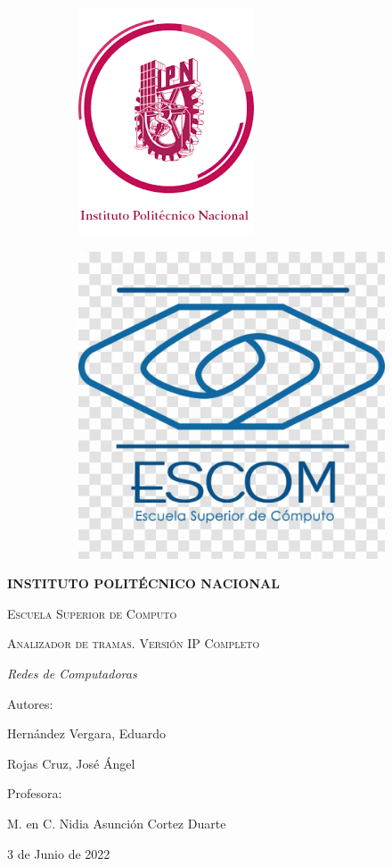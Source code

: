 	\begin{titlepage}
		\begin{figure}[!h]
			\begin{subfigure}{0.5\textwidth}
				\includegraphics[width=0.2\linewidth, inner]{logoIPN}
			\end{subfigure}
			\begin{subfigure}{0.5\textwidth}
				\includegraphics[width=0.2\linewidth, right]{logoESCOM}
			\end{subfigure}	
				
		\end{figure}		
		\centering
		\vspace{1cm}
		{\bfseries\LARGE INSTITUTO POLIT\'ECNICO NACIONAL \par}
		\vspace{1cm}
		{\scshape\Large Escuela Superior de Computo \par}
		\vspace{3cm}
		{\scshape\Huge Analizador de tramas. Versi\'on IP  Completo\par}
		\vspace{3cm}
		{\itshape\Large Redes de Computadoras \par}
		\vfill
		{\Large Autores: \par}
		{\Large Hern\'andez Vergara, Eduardo \par}
		{\Large Rojas Cruz, Jos\'e \'Angel \par}
		\vfill
		{\Large Profesora: \par}
		{\Large M. en C. Nidia Asunci\'on Cortez Duarte \par}
		\vfill
		{\Large 3 de Junio de 2022 \par}
	\end{titlepage}
